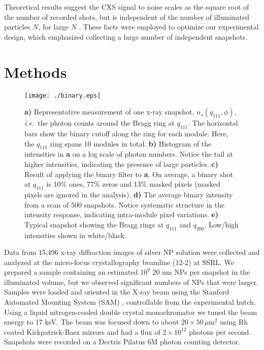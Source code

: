 \documentclass [11pt,fleqn]{article}
\begin{document}
Theoretical results suggest the CXS signal to noise scales as the square root of the number of recorded shots, but is independent of the number of illuminated particles $N $, for large $N$ \cite{Kam:1977wc, Kam:1981ua, Kirian:2011bq}. These facts were employed to optimize our experimental design, which emphasized collecting a large number of independent snapshots.

\section{Methods}

\begin{figure}
\begin{center}
\texttt{[image: ./binary.eps]}
\end{center}
\caption { {\bf a)} Representative measurement of one x-ray snapshot, $n_{s}( q_{111},\phi)$, \textit{i.e.}~the photon counts around the Bragg ring at $q_{111}$. The horizontal bars show the binary cutoff along the ring for each module. Here, the $q_{111}$ ring spans 10 modules in total. {\bf b)} Histogram of the intensities in {\bf a} on a log scale of photon numbers. Notice the tail at higher intensities, indicating the presence of large particles. {\bf c)} Result of applying the binary filter to {\bf a}. On average, a binary shot at $q_{111}$ is 10\% ones, 77\% zeros and 13\% masked pixels (masked pixels are ignored in the analysis).  {\bf d)} The average binary intensity from a scan of 500 snapshots. Notice systematic structure in the intensity response, indicating intra-module pixel variations. {\bf e)} Typical snapshot showing the Bragg rings at $q_{111}$ and $q_{200}$. Low/high intensities shown in white/black.}
\label{fig:binary}
\end{figure}


Data from 15,496 x-ray diffraction images \cite{data} of silver NP solution were collected and analyzed at the micro-focus crystallography beamline (12-2) at SSRL. We prepared a sample containing an estimated $10^{9}$  20 nm NPs per snapshot in the illuminated volume, but we observed significant numbers of NPs that were larger. Samples were loaded and oriented in the X-ray beam using the Stanford Automated Mounting System (SAM) \cite{Cohen:2002jw}, controllable from the experimental hutch. Using a liquid nitrogen-cooled double crystal monochromator we tuned the beam energy to 17 keV. The beam was focused down to about $20 \times 50 \,\mu$m$^2$ using Rh coated Kirkpatrick-Baez mirrors and had a flux of $2\times 10^{12}$ photons per second. Snapshots were recorded on a Dectris Pilatus 6M photon counting detector. 
\end{document}
